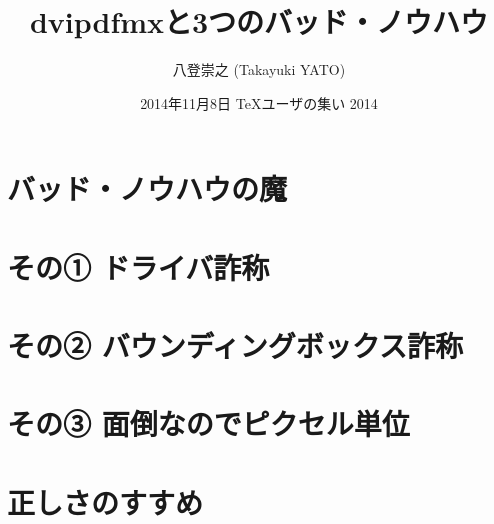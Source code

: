 \documentclass[xetex,14pt]{beamer}
\title{dvipdfmxと3つのバッド・ノウハウ}
\author[八登崇之]{八登崇之 (Takayuki YATO)}
\date{2014年11月8日 {\TeX}ユーザの集い 2014}
\begin{document}

\section{バッド・ノウハウの魔}

\section{その① ドライバ詐称}

\section{その② バウンディングボックス詐称}

\section{その③ 面倒なのでピクセル単位}

\section{正しさのすすめ}

\end{document}
